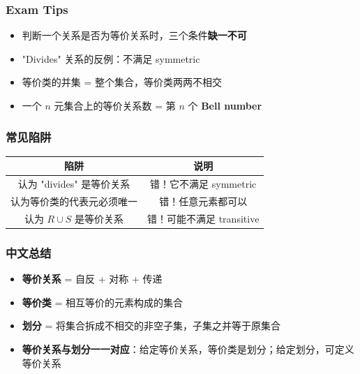\documentclass[10pt,a4paper,openany]{ctexbook}
\theoremstyle{definition}
\theoremstyle{remark}
\begin{document}
\subsubsection{Exam Tips}

\begin{itemize}
\item 判断一个关系是否为等价关系时，三个条件\textbf{缺一不可}
\item "Divides" 关系的反例：不满足 symmetric
\item 等价类的并集 = 整个集合，等价类两两不相交
\item 一个 $n$ 元集合上的等价关系数 = 第 $n$ 个 \textbf{Bell number}

\end{itemize}

\subsubsection{常见陷阱}

\begin{center}
\begin{tabular}{cc}
\hline
陷阱 & 说明 \\ \hline
认为 "divides" 是等价关系 & 错！它不满足 symmetric \\
认为等价类的代表元必须唯一 & 错！任意元素都可以 \\
认为 $R \cup S$ 是等价关系 & 错！可能不满足 transitive \\
\hline
\end{tabular}

\end{center}

\subsubsection{中文总结}

\begin{itemize}
\item \textbf{等价关系} = 自反 + 对称 + 传递
\item \textbf{等价类} = 相互等价的元素构成的集合
\item \textbf{划分} = 将集合拆成不相交的非空子集，子集之并等于原集合
\item \textbf{等价关系与划分一一对应}：给定等价关系，等价类是划分；给定划分，可定义等价关系

\end{itemize}

\vspace{-2pt}
\end{document}
